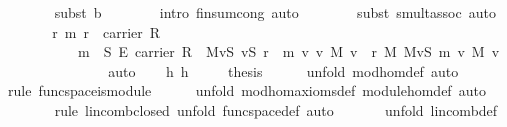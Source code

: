 \begin{isabellebody}
\ \ \ \ \ \ \isamarkupfalse%
\ {\isacharparenleft}subst\ b{}{\isacharparenright}\isanewline
\ \ \ \ \ \ \isamarkupfalse%
\ {\isacharparenleft}intro\ finsum{\isacharunderscore}cong{\isacharprime}{\isacharcomma}\ auto{\isacharparenright}\isanewline
\ \ \ \ \ \ \isamarkupfalse%
\ {\isacharparenleft}subst\ smult{\isacharunderscore}assoc{}{\isacharcomma}\ auto{\isacharparenright}\isanewline
\ \ \isacommand{{\isacharbraceright}}\isamarkupfalse%
\isanewline
\ \ \isamarkupfalse%
\ {}{\isacharcolon}\ {\isachardoublequoteopen}{\isasymAnd}r\ m{\isachardot}\ r\ {\isasymin}\ carrier\ R\ {\isasymLongrightarrow}\isanewline
\ \ \ \ \ \ \ \ \ \ \ m\ {\isasymin}\ S\ {\isasymrightarrow}\isactrlsub E\ carrier\ R\ {\isasymLongrightarrow}\ {\isacharparenleft}{\isasymOplus}\isactrlbsub M\isactrlesub v{\isasymin}S{\isachardot}\ {\isacharparenleft}{\isasymlambda}v{\isasymin}S{\isachardot}\ r\ {\isasymotimes}\ m\ v{\isacharparenright}\ v\ {\isasymodot}\isactrlbsub M\isactrlesub \ v{\isacharparenright}\ {\isacharequal}\ r\ {\isasymodot}\isactrlbsub M\isactrlesub \ {\isacharparenleft}{\isasymOplus}\isactrlbsub M\isactrlesub v{\isasymin}S{\isachardot}\ m\ v\ {\isasymodot}\isactrlbsub M\isactrlesub \ v{\isacharparenright}{\isachardoublequoteclose}\ \isanewline
\ \ \ \ \ \ \ \ \ \ \ \ \isamarkupfalse%
\ auto\isanewline
\ \ \isamarkupfalse%
\ h\ h{}\ {}\ {}\ {}\ \isamarkupfalse%
\ {\isacharquery}thesis\isanewline
\ \ \ \ \isamarkupfalse%
\ {\isacharparenleft}unfold\ mod{\isacharunderscore}hom{\isacharunderscore}def{\isacharcomma}\ auto{\isacharparenright}\isanewline
\ \ \ \ \ \isamarkupfalse%
\ {\isacharparenleft}rule\ func{\isacharunderscore}space{\isacharunderscore}is{\isacharunderscore}module{\isacharparenright}\isanewline
\ \ \ \ \isamarkupfalse%
\ {\isacharparenleft}unfold\ mod{\isacharunderscore}hom{\isacharunderscore}axioms{\isacharunderscore}def\ module{\isacharunderscore}hom{\isacharunderscore}def{\isacharcomma}\ auto{\isacharparenright}\isanewline
\ \ \ \ \ \ \isamarkupfalse%
\ {\isacharparenleft}rule\ lincomb{\isacharunderscore}closed{\isacharcomma}\ unfold\ func{\isacharunderscore}space{\isacharunderscore}def{\isacharcomma}\ auto{\isacharparenright}\isanewline
\ \ \ \ \ \isamarkupfalse%
\ {\isacharparenleft}unfold\ lincomb{\isacharunderscore}def{\isacharparenright}\isanewline
\ \ \ \ \ \isamarkupfalse%

\end{isabellebody}
